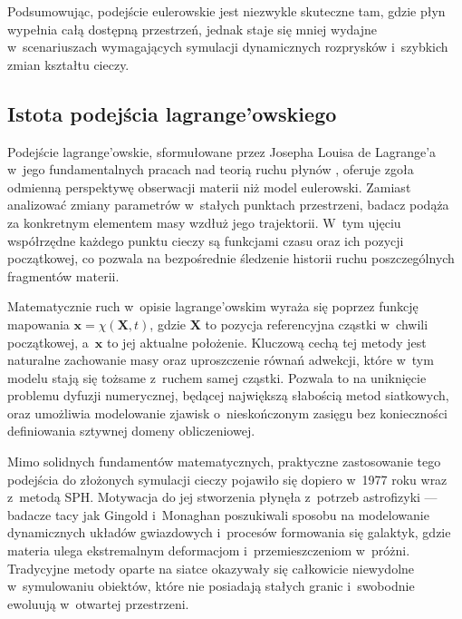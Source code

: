 Podsumowując, podejście eulerowskie jest niezwykle skuteczne tam, gdzie płyn wypełnia całą dostępną przestrzeń, jednak 
staje się mniej wydajne w~scenariuszach wymagających symulacji dynamicznych rozprysków i~szybkich zmian kształtu cieczy.

\subsection{Istota podejścia lagrange'owskiego}
Podejście lagrange'owskie, sformułowane przez Josepha Louisa de Lagrange'a w~jego fundamentalnych pracach nad 
teorią ruchu płynów \cite{lagrange1788mecanique}, oferuje zgoła odmienną perspektywę obserwacji materii niż model 
eulerowski. Zamiast analizować zmiany parametrów w~stałych punktach przestrzeni, badacz podąża za konkretnym 
elementem masy wzdłuż jego trajektorii. W~tym ujęciu współrzędne każdego punktu cieczy są funkcjami czasu oraz 
ich pozycji początkowej, co pozwala na bezpośrednie śledzenie historii ruchu poszczególnych fragmentów materii.

Matematycznie ruch w~opisie lagrange'owskim wyraża się poprzez funkcję mapowania $\mathbf{x} = \chi(\mathbf{X}, t)$\cite{batchelor1967introduction},
gdzie $\mathbf{X}$ to pozycja referencyjna cząstki w~chwili początkowej, a~$\mathbf{x}$ to jej aktualne położenie.
Kluczową cechą tej metody jest naturalne zachowanie masy oraz uproszczenie równań adwekcji, które w~tym modelu stają 
się tożsame z~ruchem samej cząstki. Pozwala to na uniknięcie problemu dyfuzji numerycznej, będącej 
największą słabością metod siatkowych, oraz umożliwia modelowanie zjawisk o~nieskończonym zasięgu bez 
konieczności definiowania sztywnej domeny obliczeniowej.

Mimo solidnych fundamentów matematycznych, praktyczne zastosowanie tego podejścia do złożonych symulacji 
cieczy pojawiło się dopiero w~1977 roku wraz z~metodą SPH\cite{gingold1977smoothed}. Motywacja do jej stworzenia płynęła z~potrzeb
astrofizyki --- badacze tacy jak Gingold i~Monaghan poszukiwali sposobu na modelowanie dynamicznych układów 
gwiazdowych i~procesów formowania się galaktyk, gdzie materia ulega ekstremalnym deformacjom
i~przemieszczeniom w~próżni. Tradycyjne metody oparte na siatce okazywały się całkowicie niewydolne
w~symulowaniu obiektów, które nie posiadają stałych granic i~swobodnie ewoluują w~otwartej przestrzeni.

